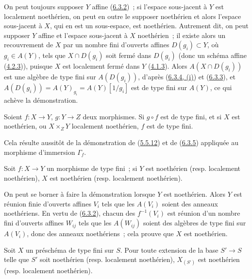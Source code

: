 On peut toujours supposer $Y$ affine (\hyperref[I.6.3.2-fr]{6.3.2})~; si
l'espace sous-jacent à $Y$ est localement noethérien, on peut en outre le
supposer noethérien et alors l'espace sous-jacent à $X$, qui en est un
sous-espace, est noethérien. Autrement dit, on peut supposer $Y$ affine et
l'espace sous-jacent à $X$ noethérien~; il existe alors un recouvrement de $X$
par un nombre fini d'ouverts affines $D(g_i)\subset Y$, où $g_i\in A(Y)$, tels
que $X\cap D(g_i)$ soit fermé dans $D(g_i)$ (donc un schéma affine
(\hyperref[I.4.2.3-fr]{4.2.3})), puisque $X$ est localement fermé dans $Y$
(\hyperref[I.4.1.3-fr]{4.1.3}). Alors $A(X\cap D(g_i))$ est une algèbre de type
fini sur $A(D(g_i))$, d'après (\hyperref[I.6.3.4-fr]{6.3.4, (i)}) et
(\hyperref[I.6.3.3-fr]{6.3.3}), et
$A(D(g_i))=A(Y)_{g_i}=A(Y)[1/g_i]$ est de type fini sur $A(Y)$, ce qui achève
la démonstration.

\begin{corollary}[6.3.6]
\label{I.6.3.6-fr}
Soient $f:X\to Y$, $g:Y\to Z$ deux morphismes. Si $g\circ f$ est de type fini,
et si $X$ est noethérien, ou $X\times_Z Y$ localement noethérien, $f$ est de
type fini.
\end{corollary}

Cela résulte aussitôt de la démonstration de
(\hyperref[I.5.5.12-fr]{5.5.12}) et de (\hyperref[I.6.3.5-fr]{6.3.5}) appliquée
au morphisme d'immersion $\Gamma_f$.

\begin{proposition}[6.3.7]
\label{I.6.3.7-fr}
Soit $f:X\to Y$ un morphisme de type fini~; si $Y$ est noethérien (resp.
localement noethérien), $X$ est noethérien (resp. localement noethérien).
\end{proposition}

On peut se borner à faire la démonstration lorsque $Y$ est noethérien. Alors $Y$
est réunion finie d'ouverts affines $V_i$ tels que les $A(V_i)$ soient des
anneaux noethériens. En vertu de (\hyperref[I.6.3.2-fr]{6.3.2}), chacun des
$f^{-1}(V_i)$ est réunion d'un nombre fini d'ouverts affines $W_{ij}$ tels que
les $A(W_{ij})$ soient des algèbres de type fini sur $A(V_i)$, donc des anneaux
noethériens~; cela prouve que $X$ est noethérien.

\begin{corollary}[6.3.8]
\label{I.6.3.8-fr}
Soit $X$ un préschéma de type fini sur $S$. Pour toute extension de la base
$S'\to S$ telle que $S'$ soit noethérien (resp. localement noethérien),
$X_{(S')}$ est noethérien (resp. localement noethérien).
\end{corollary}

